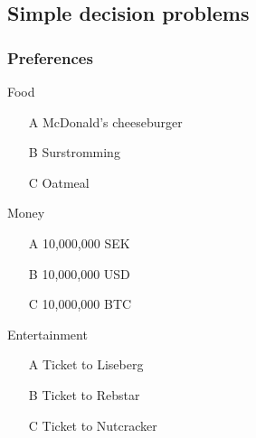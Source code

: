 \subsection{Simple decision problems}
\begin{frame}
  \frametitle{Preferences}
  \begin{example}
    \begin{block}{Food}
      \begin{itemize}
      \item[A] McDonald's cheeseburger
      \item[B] Surstromming
      \item[C] Oatmeal
      \end{itemize}
    \end{block}
    \begin{block}{Money}
      \begin{itemize}
      \item[A] 10,000,000 SEK
      \item[B] 10,000,000 USD
      \item[C] 10,000,000 BTC
      \end{itemize}
    \end{block}
    \begin{block}{Entertainment}
      \begin{itemize}
      \item[A] Ticket to Liseberg
      \item[B] Ticket to Rebstar
      \item[C] Ticket to Nutcracker
      \end{itemize}
    \end{block}
  \end{example}


\end{frame}
